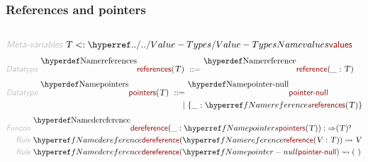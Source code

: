 \subsubsection*{References and pointers}\hypertarget{references-and-pointers}{}\label{references-and-pointers}

\begin{align*}
  [ ~ 
  \KEY{Datatype} ~ & \NAMEREF{references} \\
  \KEY{Funcon} ~ & \NAMEREF{reference} \\
  \KEY{Type} ~ & \NAMEREF{pointers} \\
  \KEY{Funcon} ~ & \NAMEREF{pointer-null} \\
  \KEY{Funcon} ~ & \NAMEREF{dereference}
  ~ ]
\end{align*}
\begin{align*}
  \KEY{Meta-variables} ~ 
  & \VAR{T} <: \NAMEHYPER{../..}{Value-Types}{values}
\end{align*}
\begin{align*}
  \KEY{Datatype} ~ 
  \NAMEDECL{references}(\VAR{T} )  
  ~ ::= ~ & \NAMEDECL{reference} (\_ : \VAR{T})
\end{align*}
\begin{align*}
  \KEY{Datatype} ~ 
  \NAMEDECL{pointers}(\VAR{T} )  
  ~ ::= ~ & 
  \NAMEDECL{pointer-null}  \\
  ~ \mid ~ & \{ \_ : \NAMEREF{references}
               ( \VAR{T} ) \}
\end{align*}
\begin{align*}
  \KEY{Funcon} ~ 
  & \NAMEDECL{dereference}(\_ : \NAMEREF{pointers}
                                ( \VAR{T} )) :  \TO ( \VAR{T} )\QUERY
\\
  \KEY{Rule} ~ 
    & \NAMEREF{dereference}
        ( \NAMEREF{reference}
            ( \VAR{V} : \VAR{T} ) ) \leadsto
        \VAR{V}
\\
  \KEY{Rule} ~ 
    & \NAMEREF{dereference}
        ( \NAMEREF{pointer-null} ) \leadsto
        (  ~  )
\end{align*}
